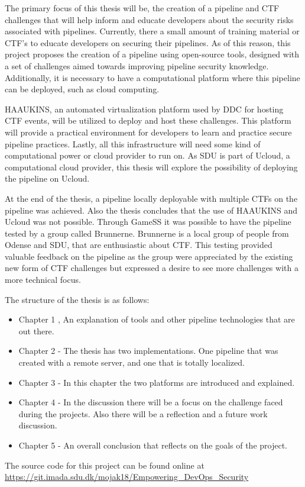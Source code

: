 The primary focus of this thesis will be, the creation of a pipeline and \ac{CTF} challenges that 
will help inform and educate developers about the security risks associated with pipelines. 
Currently, there a small amount of training material or \ac{CTF}'s to educate developers on securing their pipelines.
As of this reason, this project proposes the creation of a pipeline using open-source tools, 
designed with a set of challenges aimed towards improving pipeline security knowledge. 
Additionally, it is necessary to have a computational platform where this pipeline can be deployed, such as cloud computing.

HAAUKINS, an automated virtualization platform used by \ac{DDC} for hosting \ac{CTF} events, will be utilized to deploy and host these challenges. 
This platform will provide a practical environment for developers to learn and practice secure pipeline practices. 
Lastly, all this infrastructure will need some kind of computational power or cloud provider to run on. As 
\ac{SDU} is part of \ac{Ucloud}, a computational cloud provider, this thesis will explore the 
possibility of deploying the pipeline on \ac{Ucloud}.

At the end of the thesis, a pipeline locally deployable with multiple \ac{CTF}s on the pipeline was achieved.
Also the thesis concludes that the use of \ac{HAAUKINS} and \ac{Ucloud} was not possible.
Through GameSS\cite{gamess} it was possible to have
the pipeline tested by a group called Brunnerne. Brunnerne is a local group of people from Odense and \ac{SDU}, that are
enthusiastic about \ac{CTF}. This testing provided valuable feedback on the pipeline as the group were appreciated 
by the existing new form of \ac{CTF} challenges but expressed a desire to see more challenges with a more technical focus.

The structure of the thesis is as follows:
\begin{itemize}
    \item Chapter 1 , An explanation of tools and other pipeline technologies that are out there.
    \item Chapter 2  - The thesis has two implementations. One pipeline that was created with a remote server, and 
    one that is totally localized.
    \item Chapter 3  - In this chapter the two platforms are introduced and explained.
    \item Chapter 4  - In the discussion there will be a focus on the challenge faced during the projects.
    Also there will be a reflection and a future work discussion.
    \item Chapter 5  - An overall conclusion that reflects on the goals of the project.
\end{itemize}
The source code for this project can be found online at \url{https://git.imada.sdu.dk/mojak18/Empowering_DevOps_Security}